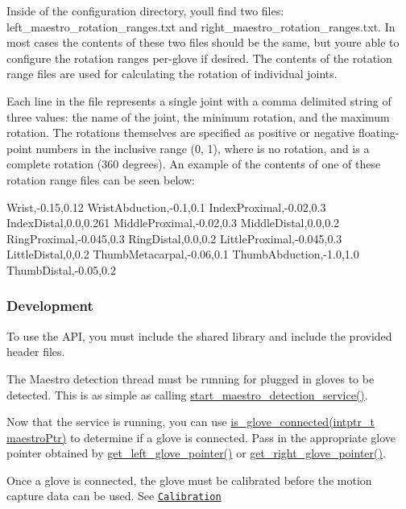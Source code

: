 Inside of the configuration directory, you\textquotesingle{}ll find two files\+: {\ttfamily left\+\_\+maestro\+\_\+rotation\+\_\+ranges.\+txt} and {\ttfamily right\+\_\+maestro\+\_\+rotation\+\_\+ranges.\+txt}. In most cases the contents of these two files should be the same, but you\textquotesingle{}re able to configure the rotation ranges per-\/glove if desired. The contents of the rotation range files are used for calculating the rotation of individual joints.

Each line in the file represents a single joint with a comma delimited string of three values\+: the name of the joint, the minimum rotation, and the maximum rotation. The rotations themselves are specified as positive or negative floating-\/point numbers in the inclusive range {\ttfamily (0, 1)}, where {} is no rotation, and {} is a complete rotation (360 degrees). An example of the contents of one of these rotation range files can be seen below\+: \begin{DoxyVerb}Wrist,-0.15,0.12
WristAbduction,-0.1,0.1
IndexProximal,-0.02,0.3
IndexDistal,0.0,0.261
MiddleProximal,-0.02,0.3
MiddleDistal,0.0,0.2
RingProximal,-0.045,0.3
RingDistal,0.0,0.2
LittleProximal,-0.045,0.3
LittleDistal,0,0.2
ThumbMetacarpal,-0.06,0.1
ThumbAbduction,-1.0,1.0
ThumbDistal,-0.05,0.2
\end{DoxyVerb}


\subsubsection*{Development}

To use the A\+PI, you must include the shared library and include the provided header files.


\begin{DoxyEnumerate}
\item The Maestro detection thread must be running for plugged in gloves to be detected. This is as simple as calling {\ttfamily \hyperlink{group__glove_management_ga10088517f643220611dfcd5da08bfaa1}{start\+\_\+maestro\+\_\+detection\+\_\+service()}}.
\item Now that the service is running, you can use {\ttfamily \hyperlink{group__glove_management_ga85666868951331c5266df7559abeefbc}{is\+\_\+glove\+\_\+connected(intptr\+\_\+t maestro\+Ptr)}} to determine if a glove is connected. Pass in the appropriate glove pointer obtained by {\ttfamily \hyperlink{group__glove_management_ga63ce3c99d4a8b8db851b22af9185764e}{get\+\_\+left\+\_\+glove\+\_\+pointer()}} or {\ttfamily \hyperlink{group__glove_management_ga9b8fd9d91aeac3f8da50f7a7eba0c32b}{get\+\_\+right\+\_\+glove\+\_\+pointer()}}.
\item Once a glove is connected, the glove must be calibrated before the motion capture data can be used. See \href{#calibrationHeader}{\tt Calibration}
\end{DoxyEnumerate}

